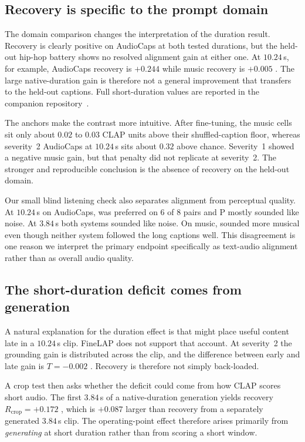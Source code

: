 \subsection{Recovery is specific to the prompt domain}
The domain comparison changes the interpretation of the duration result. Recovery is clearly positive on AudioCaps at both tested durations, but the held-out hip-hop battery shows no resolved alignment gain at either one. At $10.24$\,s, for example, AudioCaps recovery is $+0.244$ while music recovery is $+0.005$ . The large native-duration gain is therefore not a general improvement that transfers to the held-out captions. Full short-duration values are reported in the companion repository~\cite{bibbo2026repo}.

The anchors make the contrast more intuitive. After fine-tuning, the music cells sit only about $0.02$ to $0.03$ CLAP units above their shuffled-caption floor, whereas severity~2 AudioCaps at $10.24$\,s sits about $0.32$ above chance. Severity~1 showed a negative music gain, but that penalty did not replicate at severity~2. The stronger and reproducible conclusion is the absence of recovery on the held-out domain.

Our small blind listening check also separates alignment from perceptual quality. At $10.24$\,s on AudioCaps, \PFT{} was preferred on 6 of 8 pairs and P mostly sounded like noise. At $3.84$\,s both systems sounded like noise. On music, \PFT{} sounded more musical even though neither system followed the long captions well. This disagreement is one reason we interpret the primary endpoint specifically as text-audio alignment rather than as overall audio quality.

\subsection{The short-duration deficit comes from generation}
A natural explanation for the duration effect is that \PFT{} might place useful content late in a $10.24$\,s clip. FineLAP does not support that account. At severity~2 the grounding gain is distributed across the clip, and the difference between early and late gain is $T=-0.002$ . Recovery is therefore not simply back-loaded.

A crop test then asks whether the deficit could come from how CLAP scores short audio. The first $3.84$\,s of a native-duration generation yields recovery $R_{\mathrm{crop}}=+0.172$ , which is $+0.087$  larger than recovery from a separately generated $3.84$\,s clip. The operating-point effect therefore arises primarily from \emph{generating} at short duration rather than from scoring a short window.

